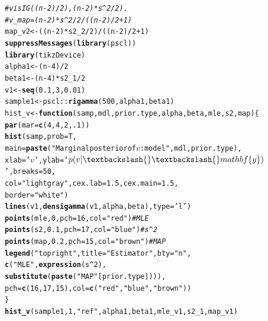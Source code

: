 \documentclass[12pt]{article}\usepackage[]{graphicx}\usepackage[]{color}
\makeatletter
\newcommand{\hlnum}[1]{\textcolor[rgb]{0.686,0.059,0.569}{#1}}%
\newcommand{\hlstr}[1]{\textcolor[rgb]{0.192,0.494,0.8}{#1}}%
\newcommand{\hlcom}[1]{\textcolor[rgb]{0.678,0.584,0.686}{\textit{#1}}}%
\newcommand{\hlopt}[1]{\textcolor[rgb]{0,0,0}{#1}}%
\newcommand{\hlstd}[1]{\textcolor[rgb]{0.345,0.345,0.345}{#1}}%
\newcommand{\hlkwa}[1]{\textcolor[rgb]{0.161,0.373,0.58}{\textbf{#1}}}%
\newcommand{\hlkwb}[1]{\textcolor[rgb]{0.69,0.353,0.396}{#1}}%
\newcommand{\hlkwc}[1]{\textcolor[rgb]{0.333,0.667,0.333}{#1}}%
\newcommand{\hlkwd}[1]{\textcolor[rgb]{0.737,0.353,0.396}{\textbf{#1}}}%
\newenvironment{kframe}{%
 \def\at@end@of@kframe{}%
 \ifinner\ifhmode%
  \def\at@end@of@kframe{\end{minipage}}%
  \begin{minipage}{\columnwidth}%
 \fi\fi%
 \def\FrameCommand##1{\hskip\@totalleftmargin \hskip-\fboxsep
 \colorbox{shadecolor}{##1}\hskip-\fboxsep
     \hskip-\linewidth \hskip-\@totalleftmargin \hskip\columnwidth}%
 \MakeFramed {\advance\hsize-\width
   \@totalleftmargin\z@ \linewidth\hsize
   \@setminipage}}%
 {\par\unskip\endMakeFramed%
 \at@end@of@kframe}
\newenvironment{knitrout}{}{} %
\makeatother
\begin{document}
\begin{knitrout}
\begin{kframe}
\begin{alltt}
\hlcom{# v is IG((n - 2) / 2), (n - 2) * s ^ 2 / 2).}
\hlcom{# v_map = (n - 2) * s ^ 2 / 2 /((n - 2) / 2 + 1)}
\hlstd{map_v2} \hlkwb{<-} \hlstd{((n} \hlopt{-} \hlnum{2}\hlstd{)} \hlopt{*} \hlstd{s2_2} \hlopt{/} \hlnum{2}\hlstd{)} \hlopt{/} \hlstd{((n} \hlopt{-} \hlnum{2}\hlstd{)} \hlopt{/} \hlnum{2} \hlopt{+} \hlnum{1}\hlstd{)}
\hlkwd{suppressMessages}\hlstd{(}\hlkwd{library}\hlstd{(pscl))}
\hlkwd{library}\hlstd{(tikzDevice)}
\hlstd{alpha1} \hlkwb{<-} \hlstd{(n} \hlopt{-} \hlnum{4}\hlstd{)} \hlopt{/} \hlnum{2}
\hlstd{beta1} \hlkwb{<-} \hlstd{(n} \hlopt{-} \hlnum{4}\hlstd{)} \hlopt{*} \hlstd{s2_1}\hlopt{/}\hlnum{2}
\hlstd{v1} \hlkwb{<-} \hlkwd{seq}\hlstd{(}\hlnum{0.1}\hlstd{,} \hlnum{3}\hlstd{,} \hlnum{0.01}\hlstd{)}
\hlstd{sample1} \hlkwb{<-} \hlstd{pscl}\hlopt{::}\hlkwd{rigamma}\hlstd{(}\hlnum{500}\hlstd{, alpha1, beta1)}
\hlstd{hist_v} \hlkwb{<-} \hlkwa{function}\hlstd{(}\hlkwc{samp}\hlstd{,} \hlkwc{mdl}\hlstd{,} \hlkwc{prior.type}\hlstd{,} \hlkwc{alpha}\hlstd{,} \hlkwc{beta}\hlstd{,} \hlkwc{mle}\hlstd{,} \hlkwc{s2}\hlstd{,} \hlkwc{map}\hlstd{) \{}
    \hlkwd{par}\hlstd{(}\hlkwc{mar} \hlstd{=} \hlkwd{c}\hlstd{(}\hlnum{4}\hlstd{,} \hlnum{4}\hlstd{,} \hlnum{2}\hlstd{,} \hlnum{.1}\hlstd{))}
    \hlkwd{hist}\hlstd{(samp,} \hlkwc{prob} \hlstd{= T,}
         \hlkwc{main} \hlstd{=} \hlkwd{paste}\hlstd{(}\hlstr{"Marginal posterior of $v$: model"}\hlstd{, mdl, prior.type),}
         \hlkwc{xlab} \hlstd{=} \hlstr{'$v$'}\hlstd{,} \hlkwc{ylab} \hlstd{=} \hlstr{'$p(v|\textbackslash{}\textbackslash{}mathbf\{y\})$'}\hlstd{,} \hlkwc{breaks} \hlstd{=} \hlnum{50}\hlstd{,}
         \hlkwc{col}  \hlstd{=}\hlstr{"lightgray"}\hlstd{,} \hlkwc{cex.lab} \hlstd{=} \hlnum{1.5}\hlstd{,} \hlkwc{cex.main} \hlstd{=} \hlnum{1.5}\hlstd{,}
         \hlkwc{border} \hlstd{=} \hlstr{"white"}\hlstd{)}
    \hlkwd{lines}\hlstd{(v1,} \hlkwd{densigamma}\hlstd{(v1, alpha, beta),} \hlkwc{type} \hlstd{=} \hlstr{'l'}\hlstd{)}
    \hlkwd{points}\hlstd{(mle,} \hlnum{0}\hlstd{,} \hlkwc{pch} \hlstd{=} \hlnum{16}\hlstd{,} \hlkwc{col} \hlstd{=} \hlstr{"red"}\hlstd{)}  \hlcom{# MLE}
    \hlkwd{points}\hlstd{(s2,} \hlnum{0.1}\hlstd{,} \hlkwc{pch} \hlstd{=} \hlnum{17}\hlstd{,} \hlkwc{col} \hlstd{=} \hlstr{"blue"}\hlstd{)}   \hlcom{# s^2}
    \hlkwd{points}\hlstd{(map,} \hlnum{0.2}\hlstd{,} \hlkwc{pch} \hlstd{=} \hlnum{15}\hlstd{,} \hlkwc{col} \hlstd{=} \hlstr{"brown"}\hlstd{)}  \hlcom{# MAP}
    \hlkwd{legend}\hlstd{(}\hlstr{"topright"}\hlstd{,} \hlkwc{title} \hlstd{=} \hlstr{"Estimator"}\hlstd{,} \hlkwc{bty} \hlstd{=} \hlstr{"n"}\hlstd{,}
           \hlkwd{c}\hlstd{(}\hlstr{"MLE"}\hlstd{,} \hlkwd{expression}\hlstd{(s}\hlopt{^}\hlnum{2}\hlstd{),}
             \hlkwd{substitute}\hlstd{(}\hlkwd{paste}\hlstd{(}\hlstr{"MAP"}\hlstd{[prior.type]))),}
           \hlkwc{pch} \hlstd{=} \hlkwd{c}\hlstd{(}\hlnum{16}\hlstd{,} \hlnum{17}\hlstd{,} \hlnum{15}\hlstd{),} \hlkwc{col} \hlstd{=} \hlkwd{c}\hlstd{(}\hlstr{"red"}\hlstd{,} \hlstr{"blue"}\hlstd{,} \hlstr{"brown"}\hlstd{))}
\hlstd{\}}
\hlkwd{hist_v}\hlstd{(sample1,} \hlnum{1}\hlstd{,} \hlstr{"ref"}\hlstd{, alpha1, beta1, mle_v1, s2_1, map_v1)}


\end{alltt}
\end{kframe}
\end{knitrout}
\end{document}
